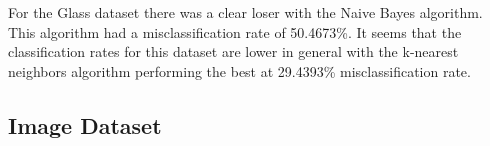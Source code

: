 \documentclass{article}
\begin{document}
\begin{enumerate}[label = (\alph*), left=10pt, itemsep=10pt]
\begin{minipage}[t]{0.9\textwidth}
\begin{figure}[H]
            \end{figure}
        \end{minipage}\\
        \vspace*{10pt}\\
        \begin{minipage}[t]{0.9\textwidth}
            For the Glass dataset there was a clear loser with the Naive Bayes algorithm. This algorithm had a misclassification rate
            of 50.4673\%. It seems that the classification rates for this dataset are lower in general with the k-nearest neighbors algorithm
            performing the best at 29.4393\% misclassification rate.
        \end{minipage}
    \end{enumerate}

    \subsection*{Image Dataset}
    
\end{document}
